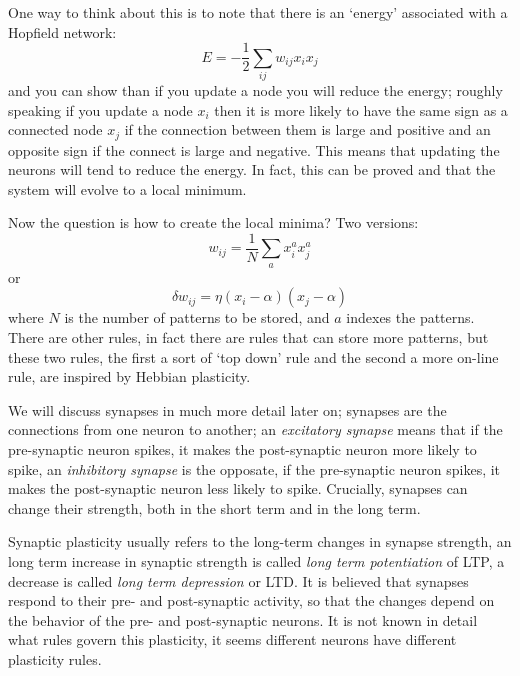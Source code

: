 \documentclass[12pt]{article}
\begin{document}
One way to think about this is to note that there is an
\lq{}energy\rq{} associated with a Hopfield network:
\begin{equation}
E=-\frac{1}{2}\sum_{ij} w_{ij}x_ix_j
\end{equation}
and you can show than if you update a node you will reduce the energy;
roughly speaking if you update a node $x_i$ then it is more likely to
have the same sign as a connected node $x_j$ if the connection between
them is large and positive and an opposite sign if the connect is
large and negative. This means that updating the neurons will tend to
reduce the energy. In fact, this can be proved and that the system
will evolve to a local minimum.

Now the question is how to create the local minima? Two versions:
\begin{equation}
w_{ij}=\frac{1}{N}\sum_a x^a_ix^a_j
\end{equation}
or 
\begin{equation}
\delta w_{ij}=\eta (x_i-\alpha)(x_j-\alpha)
\end{equation}
where $N$ is the number of patterns to be stored, and $a$ indexes the
patterns. There are other rules, in fact there are rules that can
store more patterns, but these two rules, the first a sort of \lq{}top
down\rq{} rule and the second a more on-line rule, are inspired by
Hebbian plasticity.

We will discuss synapses in much more detail later on; synapses are
the connections from one neuron to another; an \textsl{excitatory
  synapse} means that if the pre-synaptic neuron spikes, it makes the
post-synaptic neuron more likely to spike, an \textsl{inhibitory
  synapse} is the opposate, if the pre-synaptic neuron spikes, it
makes the post-synaptic neuron less likely to spike. Crucially,
synapses can change their strength, both in the short term and in the
long term.

Synaptic plasticity usually refers to the long-term changes in synapse
strength, an long term increase in synaptic strength is called
\textsl{long term potentiation} of LTP, a decrease is called
\textsl{long term depression} or LTD. It is believed that synapses
respond to their pre- and post-synaptic activity, so that the changes
depend on the behavior of the pre- and post-synaptic neurons. It is
not known in detail what rules govern this plasticity, it seems
different neurons have different plasticity rules.
\end{document}
